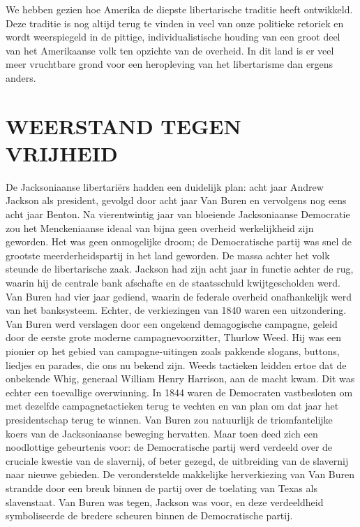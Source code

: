 \documentclass[
  a5paper,
  smalldemyvopaper,10pt,twoside,onecolumn,openright,extrafontsizes,hidelinks]{memoir}
\begin{document}
We hebben gezien hoe Amerika de diepste libertarische traditie heeft
ontwikkeld. Deze traditie is nog altijd terug te vinden in veel van onze
politieke retoriek en wordt weerspiegeld in de pittige,
individualistische houding van een groot deel van het Amerikaanse volk
ten opzichte van de overheid. In dit land is er veel meer vruchtbare
grond voor een heropleving van het libertarisme dan ergens anders.

\section{WEERSTAND TEGEN VRIJHEID}\label{weerstand-tegen-vrijheid}

De Jacksoniaanse libertariërs hadden een duidelijk plan: acht jaar
Andrew Jackson als president, gevolgd door acht jaar Van Buren en
vervolgens nog eens acht jaar Benton. Na vierentwintig jaar van
bloeiende Jacksoniaanse Democratie zou het Menckeniaanse ideaal van
bijna geen overheid werkelijkheid zijn geworden. Het was geen
onmogelijke droom; de Democratische partij was snel de grootste
meerderheidspartij in het land geworden. De massa achter het volk
steunde de libertarische zaak. Jackson had zijn acht jaar in functie
achter de rug, waarin hij de centrale bank afschafte en de staatsschuld
kwijtgescholden werd. Van Buren had vier jaar gediend, waarin de
federale overheid onafhankelijk werd van het banksysteem. Echter, de
verkiezingen van 1840 waren een uitzondering. Van Buren werd verslagen
door een ongekend demagogische campagne, geleid door de eerste grote
moderne campagnevoorzitter, Thurlow Weed. Hij was een pionier op het
gebied van campagne-uitingen zoals pakkende slogans, buttons, liedjes en
parades, die ons nu bekend zijn. Weeds tactieken leidden ertoe dat de
onbekende Whig, generaal William Henry Harrison, aan de macht kwam. Dit
was echter een toevallige overwinning. In 1844 waren de Democraten
vastbesloten om met dezelfde campagnetactieken terug te vechten en van
plan om dat jaar het presidentschap terug te winnen. Van Buren zou
natuurlijk de triomfantelijke koers van de Jacksoniaanse beweging
hervatten. Maar toen deed zich een noodlottige gebeurtenis voor: de
Democratische partij werd verdeeld over de cruciale kwestie van de
slavernij, of beter gezegd, de uitbreiding van de slavernij naar nieuwe
gebieden. De veronderstelde makkelijke herverkiezing van Van Buren
strandde door een breuk binnen de partij over de toelating van Texas als
slavenstaat. Van Buren was tegen, Jackson was voor, en deze verdeeldheid
symboliseerde de bredere scheuren binnen de Democratische partij.
\end{document}

